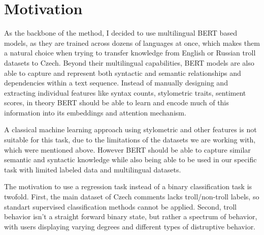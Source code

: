 \documentclass[twoside]{ctuthesis}
\theoremstyle{plain}
\theoremstyle{definition}
\theoremstyle{note}
\begin{document}
\section{Motivation}
As the backbone of the method, I decided to use multilingual BERT based models, as they are trained across dozens of languages at once, which makes them a natural choice when trying to transfer knowledge from English or Russian troll datasets to Czech. Beyond their multilingual capabilities, BERT models are also able to capture and represent both syntactic and semantic relationships and dependencies within a text sequence. Instead of manually designing and extracting individual features like syntax counts, stylometric traits, sentiment scores, in theory BERT should be able to learn and encode much of this information into its embeddings and attention mechanism.\cite{Rogers2020}\par
A classical machine learning approach using stylometric and other features is not suitable for this task, due to the limitations of the datasets we are working with, which were mentioned above. However BERT should be able to capture similar semantic and syntactic knowledge while also being able to be used in our specific task with limited labeled data and multilingual datasets.\par
The motivation to use a regression task instead of a binary classification task is twofold. First, the main dataset of Czech comments lacks troll/non-troll labels, so standart supervised classification methods cannot be applied. Second, troll behavior isn't a straight forward binary state, but rather a spectrum of behavior, with users displaying varying degrees and different types of distruptive behavior.\par
\end{document}
